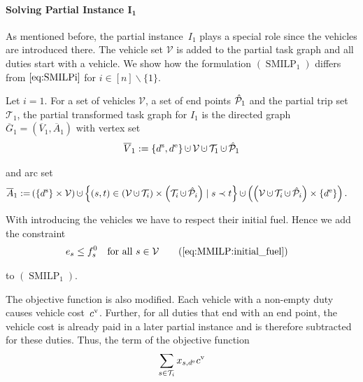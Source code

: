 \paragraph{Solving Partial Instance $\boldsymbol{I_1}$} \parfill

As mentioned before, the partial instance~$I_1$ plays a special role since the vehicles are introduced there. The vehicle set $\mathcal{V}$ is added to the partial task graph and all duties start with a vehicle. We show how the formulation $(\operatorname{SMILP}_1)$ differs from $\eqref{eq:SMILPi}$ for ${i\in[n]\backslash\{1\}}$.

\begin{definition}

Let $i=1$. For a set of vehicles $\mathcal{V}$, a set of end points $\hat{\mathcal{P}}_1$ and the partial trip set $\mathcal{T}_1$, the partial transformed task graph for $I_1$ is the directed graph $\overline{G}_1=\left(\overline{V}_1,\overline{A}_1\right)$ with vertex set
\begin{align*}
	\overline{V}_1 := \left\{\ds,\de\right\}\cupdot\mathcal{V}\cupdot\mathcal{T}_1\cupdot\Phat_1
\end{align*}

and arc set
\begin{align*}
	\overline{A}_1 := & \left(\left\{\ds\right\}\times\mathcal{V}\right)\cupdot\left\{(s,t)\in\left(\mathcal{V}\cupdot\Ti\right)\times\left(\Ti\cupdot\Phat_i\right)\mid s\prec t\right\} \cupdot\left(\left(\mathcal{V}\cupdot\Ti\cupdot\Phat_i\right)\times\left\{\de\right\}\right).
\end{align*}

\end{definition}

With introducing the vehicles we have to respect their initial fuel. Hence we add the constraint
\begin{align}
	& e_s \leq f^0_s && \text{for all } s\in\mathcal{V} \tag{\ref{eq:MMILP:initial_fuel}}
\end{align}

to $(\operatorname{SMILP}_1)$.

The objective function is also modified. Each vehicle with a non-empty duty causes vehicle cost~$c^{\operatorname{v}}$. Further, for all duties that end with an end point, the vehicle cost is already paid in a later partial instance and is therefore subtracted for these duties. Thus, the term of the objective function
\begin{align*}
	\sum_{s\in\mathcal{T}_i} x_{s,d^{\operatorname{e}}}c^{\operatorname{v}}
\end{align*}

